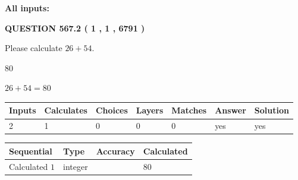 \documentclass[12pt]{article}
\begin{document}
   
   
   
\noindent{}
   
   
   
   
\noindent\vspace{0.1in}\hspace{-0.08in} {\textbf{\Large{All inputs: }}}
   
   
  
\vspace{0.2in}
  
{\textbf{\Large{QUESTION
567.2 
 ( 1 , 1 , 6791 )
}}}
  
  
 
Please calculate $ %
26 +  %
54 $.
 
 
 
\noindent{}
 
 

80
 
 
\noindent{}
 
 

 
 
 
\noindent{}
 
 

$ %
26 +  %
54=   %
80$
 
 
\noindent{}
 
 

 
   
   
   
   
\noindent\begin{tabular}{|l|l|l|l|l|l|l|}
 \hline
Inputs & Calculates & Choices & Layers & Matches & Answer & Solution \\ \hline
 2  & 
 1  & 
 0
  & 
 0  & 
 0  & 
  yes & 
  yes 
  \\ \hline
 \end{tabular}
   
   
   
   
\noindent{}
   
   
  
  
\noindent\begin{tabular}{|l|l|l|l|}
\hline
 Sequential & Type & Accuracy & Calculated \\ 
\hline
 
 
  Calculated $  1 $ & integer &  & 
  $ 80 $ 
 \\  \hline  
 \end{tabular}
   
\end{document}
